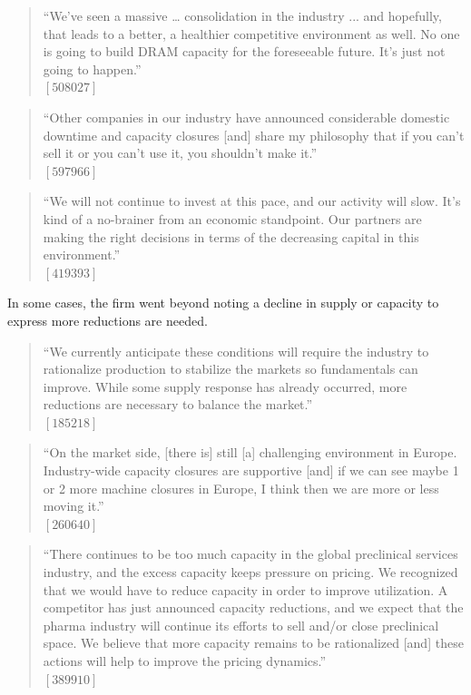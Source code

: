 \begin{quote}
``We've seen a massive … consolidation in the industry ... and hopefully, that leads to a better, a healthier competitive environment as well. No one is going to build DRAM capacity for the foreseeable future. It's just not going to happen.'' \\
$[508027]$
\end{quote}

\begin{quote}
``Other companies in our industry have announced considerable domestic downtime and capacity closures [and] share my philosophy that if you can't sell it or you can't use it, you shouldn't make it.'' \\
$[597966]$
\end{quote}

\begin{quote}
``We will not continue to invest at this pace, and our activity will slow. It's kind of a no-brainer from an economic standpoint. Our partners are making the right decisions in terms of the decreasing capital in this environment.'' \\
$[419393]$
\end{quote}

In some cases, the firm went beyond noting a decline in supply or capacity to express more reductions are needed.

\begin{quote}
``We currently anticipate these conditions will require the industry to rationalize production to stabilize the markets so fundamentals can improve. While some supply response has already occurred, more reductions are necessary to balance the market.'' \\
$[185218]$
\end{quote}

\begin{quote}
``On the market side, [there is] still [a] challenging environment in Europe. Industry-wide capacity closures are supportive [and] if we can see maybe 1 or 2 more machine closures in Europe, I think then we are more or less moving it.'' \\
$[260640]$
\end{quote}

\begin{quote}
``There continues to be too much capacity in the global preclinical services industry, and the excess capacity keeps pressure on pricing. We recognized that we would have to reduce capacity in order to improve utilization. A competitor has just announced capacity reductions, and we expect that the pharma industry will continue its efforts to sell and/or close preclinical space. We believe that more capacity remains to be rationalized [and] these actions will help to improve the pricing dynamics.'' \\
$[389910]$
\end{quote}

